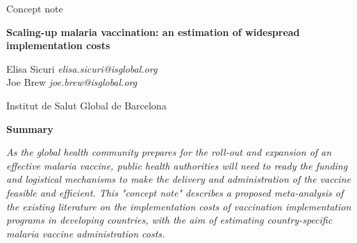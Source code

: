 \documentclass{article}
\begin{document}


\vspace{20mm}


\begin{Large}
\begin{center}
Concept note
\end{center}
\end{Large}


\begin{Large}
\begin{center}
\textbf{Scaling-up malaria vaccination: an estimation of widespread implementation costs} 
\end{center}
\end{Large}


\vspace{5mm}

\begin{changemargin}{2.5cm}{2.5cm} 
\begin{center}
\begin{large}
Elisa Sicuri \hfill \emph{elisa.sicuri@isglobal.org} \\ 
Joe Brew \hfill \emph{joe.brew@isglobal.org} \\
\end{large}
\end{center}
\end{changemargin}


\vspace{6mm}

\begin{center}
\begin{large}
Institut de Salut Global de Barcelona 
\end{large}
\end{center}


\begin{changemargin}{3cm}{3cm} 

\begin{center}
\textbf{Summary}
\end{center}

\emph{As the global health community prepares for the roll-out and expansion of an effective malaria vaccine, public health authorities will need to ready the funding and logistical mechanisms to make the delivery and administration of the vaccine feasible and efficient. This "concept note" describes a proposed meta-analysis of the existing literature on the implementation costs of vaccination implementation programs in developing countries, with the aim of estimating country-specific malaria vaccine administration costs.}
\end{changemargin}
\vfill  
\end{document}
